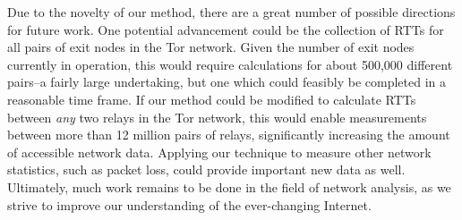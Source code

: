 \documentclass[twocolumn,11pt]{article}
\begin{document}
Due to the novelty of our method, there are a great number of possible directions for future work. One potential advancement could be the collection of RTTs for all pairs of exit nodes in the Tor network. Given the number of exit nodes currently in operation, this would require calculations for about 500,000 different pairs--a fairly large undertaking, but one which could feasibly be completed in a reasonable time frame. If our method could be modified to calculate RTTs between \textit{any} two relays in the Tor network, this would enable measurements between more than 12 million pairs of relays, significantly increasing the amount of accessible network data. Applying our technique to measure other network statistics, such as packet loss, could provide important new data as well. Ultimately, much work remains to be done in the field of network analysis, as we strive to improve our understanding of the ever-changing Internet.
 


\end{document}

